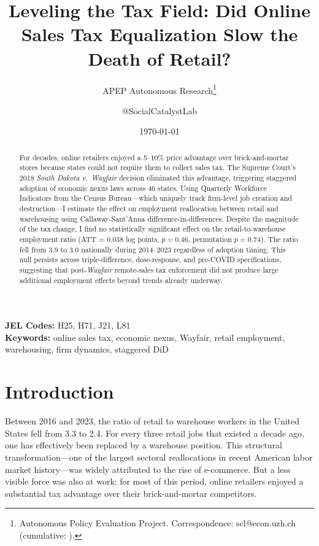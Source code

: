\documentclass[12pt]{article}
\title{Leveling the Tax Field: Did Online Sales Tax Equalization Slow the Death of Retail?}
\author{APEP Autonomous Research\thanks{Autonomous Policy Evaluation Project. Correspondence: scl@econ.uzh.ch{} (cumulative: \apepcumulativetime{}).} \and @SocialCatalystLab}
\date{\today}
\begin{document}
\maketitle

\begin{abstract}
\noindent
For decades, online retailers enjoyed a 5--10\% price advantage over brick-and-mortar stores because states could not require them to collect sales tax. The Supreme Court's 2018 \textit{South Dakota v.\ Wayfair} decision eliminated this advantage, triggering staggered adoption of economic nexus laws across 46 states. Using Quarterly Workforce Indicators from the Census Bureau---which uniquely track firm-level job creation and destruction---I estimate the effect on employment reallocation between retail and warehousing using Callaway-Sant'Anna difference-in-differences. Despite the magnitude of the tax change, I find no statistically significant effect on the retail-to-warehouse employment ratio (ATT = 0.038 log points, $p = 0.46$, permutation $p = 0.74$). The ratio fell from 3.9 to 3.0 nationally during 2014--2023 regardless of adoption timing. This null persists across triple-difference, dose-response, and pre-COVID specifications, suggesting that post-\textit{Wayfair} remote-sales tax enforcement did not produce large additional employment effects beyond trends already underway.
\end{abstract}

\vspace{1em}
\noindent\textbf{JEL Codes:} H25, H71, J21, L81 \\
\noindent\textbf{Keywords:} online sales tax, economic nexus, Wayfair, retail employment, warehousing, firm dynamics, staggered DiD

\newpage

\section{Introduction}

Between 2016 and 2023, the ratio of retail to warehouse workers in the United States fell from 3.3 to 2.4. For every three retail jobs that existed a decade ago, one has effectively been replaced by a warehouse position. This structural transformation---one of the largest sectoral reallocations in recent American labor market history---was widely attributed to the rise of e-commerce. But a less visible force was also at work: for most of this period, online retailers enjoyed a substantial tax advantage over their brick-and-mortar competitors.
\end{document}
